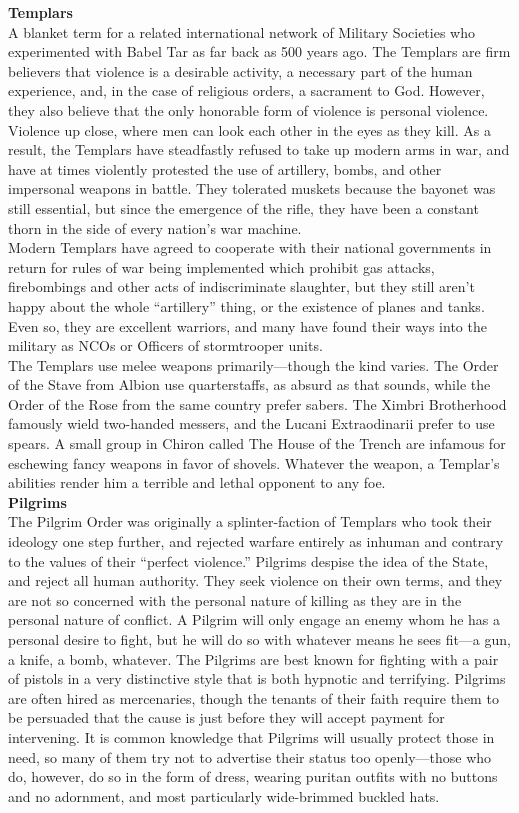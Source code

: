 \documentclass[a4paper, twocolumn, openany]{book}
\begin{document}
{{\bfseries Templars\\}
A blanket term for a related international network of Military Societies who experimented with Babel Tar as
far back as 500 years ago. The Templars are firm believers that violence is a desirable activity, a necessary
part of the human experience, and, in the case of religious orders, a sacrament to God. However, they also
believe that the only honorable form of violence is personal violence. Violence up close, where men can look
each other in the eyes as they kill. As a result, the Templars have steadfastly refused to take up modern
arms in war, and have at times violently protested the use of artillery, bombs, and other impersonal weapons
in battle. They tolerated muskets because the bayonet was still essential, but since the emergence of the
rifle, they have been a constant thorn in the side of every nation's war machine.\\
Modern Templars have agreed to cooperate with their national governments in return for rules of war being
implemented which prohibit gas attacks, firebombings and other acts of indiscriminate slaughter, but they
still aren't happy about the whole “artillery” thing, or the existence of planes and tanks. Even so, they are
excellent warriors, and many have found their ways into the military as NCOs or Officers of stormtrooper
units.\\
The Templars use melee weapons primarily—though the kind varies. The Order of the Stave from Albion
use quarterstaffs, as absurd as that sounds, while the Order of the Rose from the same country prefer
sabers. The Ximbri Brotherhood famously wield two-handed messers, and the Lucani Extraodinarii prefer to
use spears. A small group in Chiron called The House of the Trench are infamous for eschewing fancy
weapons in favor of shovels. Whatever the weapon, a Templar's abilities render him a terrible and lethal
opponent to any foe.\\

{\bfseries Pilgrims\\}
The Pilgrim Order was originally a splinter-faction of Templars who took their ideology one step further, and
rejected warfare entirely as inhuman and contrary to the values of their “perfect violence.” Pilgrims despise
the idea of the State, and reject all human authority. They seek violence on their own terms, and they are
not so concerned with the personal nature of killing as they are in the personal nature of conflict. A Pilgrim
will only engage an enemy whom he has a personal desire to fight, but he will do so with whatever means
he sees fit—a gun, a knife, a bomb, whatever. The Pilgrims are best known for fighting with a pair of pistols
in a very distinctive style that is both hypnotic and terrifying. Pilgrims are often hired as mercenaries, though
the tenants of their faith require them to be persuaded that the cause is just before they will accept payment
for intervening. It is common knowledge that Pilgrims will usually protect those in need, so many of them try
not to advertise their status too openly—those who do, however, do so in the form of dress, wearing puritan
outfits with no buttons and no adornment, and most particularly wide-brimmed buckled hats.\\

}
\end{document}
